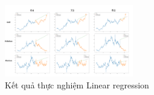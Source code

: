 \begin{figure}[htbp]
\centerline{\includegraphics[width=0.5\textwidth]{img/Linear_result.png}}
\caption{Kết quả thực nghiệm Linear regression}
\label{fig}
\end{figure}
